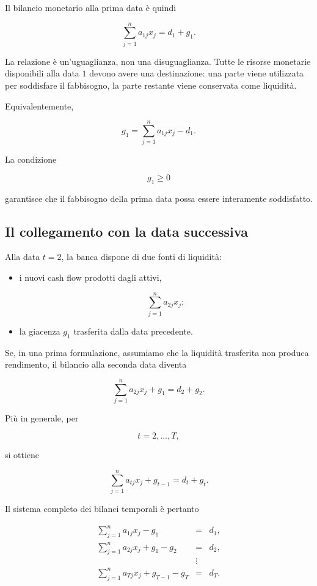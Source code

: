 Il bilancio monetario alla prima data \`e quindi

\[
\sum_{j=1}^{n}a_{1j}x_j
=
d_1+g_1.
\]

La relazione \`e un'uguaglianza, non una disuguaglianza. Tutte le risorse
monetarie disponibili alla data $1$ devono avere una destinazione: una parte
viene utilizzata per soddisfare il fabbisogno, la parte restante viene
conservata come liquidit\`a.

Equivalentemente,

\[
g_1
=
\sum_{j=1}^{n}a_{1j}x_j-d_1.
\]

La condizione

\[
g_1\geq0
\]

\noindent garantisce che il fabbisogno della prima data possa essere interamente
soddisfatto.

\subsection{Il collegamento con la data successiva}

Alla data $t=2$, la banca dispone di due fonti di liquidit\`a:

\begin{itemize}

\item i nuovi cash flow prodotti dagli attivi,

\[
\sum_{j=1}^{n}a_{2j}x_j;
\]

\item la giacenza $g_1$ trasferita dalla data precedente.

\end{itemize}

Se, in una prima formulazione, assumiamo che la liquidit\`a trasferita non
produca rendimento, il bilancio alla seconda data diventa

\[
\sum_{j=1}^{n}a_{2j}x_j
+
g_1
=
d_2+g_2.
\]

Pi\`u in generale, per

\[
t=2,\ldots,T,
\]

\noindent si ottiene

\[
\sum_{j=1}^{n}a_{tj}x_j
+
g_{t-1}
=
d_t+g_t.
\]

Il sistema completo dei bilanci temporali \`e pertanto

\[
\begin{array}{rcl}
\displaystyle
\sum_{j=1}^{n}a_{1j}x_j
-
g_1
&=&
d_1,
\\[8pt]
\displaystyle
\sum_{j=1}^{n}a_{2j}x_j
+
g_1-g_2
&=&
d_2,
\\
&\vdots&
\\
\displaystyle
\sum_{j=1}^{n}a_{Tj}x_j
+
g_{T-1}-g_T
&=&
d_T.
\end{array}
\]

